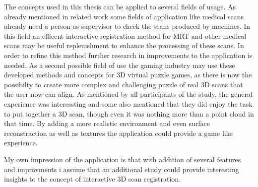 \documentclass[hyperref,english,bachelorofscience,bibnum]{cgvpub}
\begin{document}
The concepts used in this thesis can be applied to several fields of usage. As already mentioned in related work some fields of application like medical scans already need a person as supervisor to check the scans produced by machines. In this field an efficent interactive registration method for MRT and other medical scans may be useful replenishment to enhance the processing of these scans. In order to refine this method further research in improvements to the application is needed.
As a second possible field of use the gaming industry may use these developed methods and concepts for 3D virtual puzzle games, as there is now the possibilty to create more complex and challenging puzzle of real 3D scans that the user now can align. As mentioned by all participants of the study, the general experience was interessting and some also mentioned that they did enjoy the task to put together a 3D scan, though even it was nothing more than a point cloud in that time. By adding a more realistic environment and even surface reconstraction as well as textures the application could provide a game like experience.

My own impression of the application is that with addition of several features and improvments i assume that an additional study could provide interesting insights to the concept of interactive 3D scan registration.
\end{document}
